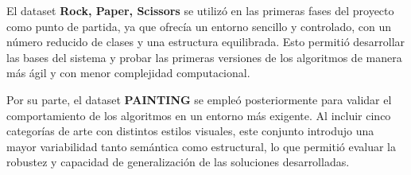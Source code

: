 \begin{table}[H]
    \centering
    \caption{Resumen comparativo de los datasets utilizados}
    \label{tab:resumen-datasets}
\end{table}

El dataset \textbf{Rock, Paper, Scissors} se utilizó en las primeras fases del proyecto como punto de partida,
ya que ofrecía un entorno sencillo y controlado, con un número reducido de clases y una estructura equilibrada.
Esto permitió desarrollar las bases del sistema y probar las primeras versiones de los algoritmos de manera más ágil y con menor complejidad computacional.

Por su parte, el dataset \textbf{PAINTING} se empleó posteriormente para validar el comportamiento de los algoritmos en un entorno más exigente.
Al incluir cinco categorías de arte con distintos estilos visuales, este conjunto introdujo una mayor variabilidad tanto semántica como estructural,
lo que permitió evaluar la robustez y capacidad de generalización de las soluciones desarrolladas.


